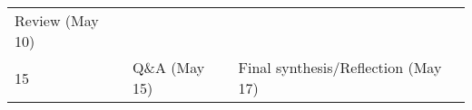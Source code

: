 \documentclass[
]{article}
\begin{document}
\begin{longtable}[]{@{}lll@{}}
\begin{minipage}[t]{0.36\columnwidth}
Review (May 10)\strut
\end{minipage}\tabularnewline
\begin{minipage}[t]{0.18\columnwidth}\raggedright
15\strut
\end{minipage} & \begin{minipage}[t]{0.38\columnwidth}\raggedright
Q\&A (May 15)\strut
\end{minipage} & \begin{minipage}[t]{0.36\columnwidth}\raggedright
Final synthesis/Reflection (May 17)\strut
\end{minipage}\tabularnewline
\bottomrule
\end{longtable}
\end{document}
